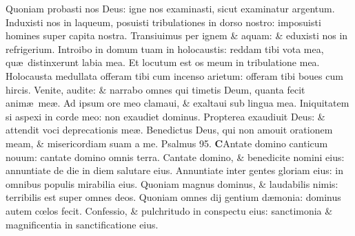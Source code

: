 \documentclass[a5paper,10pt]{book}
\def\ae{æ}
\def\oe{œ}
\begin{document}
\begin{multicols*}{2}
\newline \color{red} Q\color{black}uoniam probasti nos Deus: igne nos examinasti, sicut examinatur argentum.
\newline \color{red} I\color{black}nduxisti nos in laqueum, posuisti tribulationes in dorso nostro: imposuisti homines super capita nostra.
\newline \color{red} T\color{black}ransiuimus per ignem \& aquam: \& eduxisti nos in refrigerium.
\newline \color{red} I\color{black}ntroibo in domum tuam in holocaustis: reddam tibi vota mea, qu\ae \ distinxerunt labia mea.
\newline \color{red} E\color{black}t locutum est os meum in tribulatione mea.
\newline \color{red} H\color{black}olocausta medullata offeram tibi cum incenso arietum: offeram tibi boues cum hircis.
\newline \color{red} V\color{black}enite, audite: \& narrabo omnes qui timetis Deum, quanta fecit anim\ae \ me\ae .
\newline \color{red} A\color{black}d ipsum ore meo clamaui, \& exaltaui sub lingua mea.%
\newline \color{red} I\color{black}niquitatem si aspexi in corde meo: non exaudiet dominus.
\newline \color{red} P\color{black}ropterea exaudiuit Deus: \& attendit voci deprecationis me\ae .
\newline \color{red} B\color{black}enedictus Deus, qui non amouit orationem meam, \& misericordiam suam a me. \quad \color{red} Psalmus \hypertarget{ps95}{95.} \color{black}
\vspace{-1em}
\lettrine[lines=2]{\bfseries \color{red} C}{}Antate domino canticum nouum: cantate domino omnis terra.
\newline \color{red} C\color{black}antate domino, \& benedicite nomini eius: annuntiate de die in diem salutare eius.
\newline \color{red} A\color{black}nnuntiate inter gentes gloriam eius: in omnibus populis mirabilia eius.
\newline \color{red} Q\color{black}uoniam magnus dominus, \& laudabilis nimis: terribilis est super omnes deos.
\newline \color{red} Q\color{black}uoniam omnes dij gentium d\ae monia: dominus autem c\oe los fecit.
\newline \color{red} C\color{black}onfessio, \& pulchritudo in conspectu eius: sanctimonia \& magnificentia in sanctificatione eius.

\end{multicols*}
\end{document}
